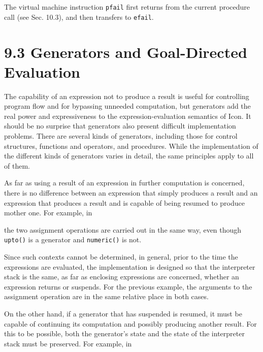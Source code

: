 The virtual machine instruction \texttt{pfail} first returns from the
current procedure call (see Sec. 10.3), and then transfers to
\texttt{efail}.


\section[9.3 Generators and Goal{}-Directed Evaluation]{9.3 Generators and Goal-Directed Evaluation}

The capability of an expression not to produce a result is useful for
controlling program flow and for bypassing unneeded computation, but
generators add the real power and expressiveness to the
expression-evaluation semantics of Icon. It should be no surprise that
generators also present difficult implementation problems. There are
several kinds of generators, including those for control structures,
functions and operators, and procedures. While the implementation of
the different kinds of generators varies in detail, the same
principles apply to all of them.


As far as using a result of an expression in further computation is
concerned, there is no difference between an expression that simply
produces a result and an expression that produces a result and is
capable of being resumed to produce mother one. For example, in

\goodbreak
{}

\noindent the two assignment operations are carried out in the same
way, even though \texttt{upto()} is a generator and \texttt{numeric()}
is not.

Since such contexts cannot be determined, in general, prior to the
time the expressions are evaluated, the implementation is designed so
that the interpreter stack is the same, as far as enclosing
expressions are concerned, whether an expression returns or
suspends. For the previous example, the arguments to the assignment
operation are in the same relative place in both cases.

On the other hand, if a generator that has suspended is resumed, it
must be capable of continuing its computation and possibly producing
another result. For this to be possible, both the generator's state
and the state of the interpreter stack must be preserved. For example,
in

